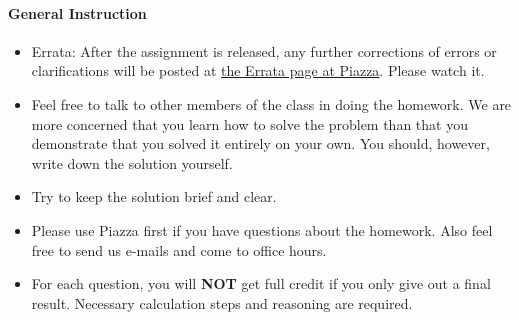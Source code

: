 

\usepackage{amsmath}
\setlength{\parindent}{0pt}
\usepackage{graphicx}
\usepackage{float}
\usepackage{bigstrut}

\usepackage{listings}
\usepackage{color}
\usepackage[utf8]{inputenc}




\oddsidemargin 0in
\evensidemargin 0in
\textwidth 6.5in
\topmargin -0.5in
\textheight 9.0in
\usepackage{multirow}
\usepackage{hyperref}

\hypersetup{colorlinks=true}
\usepackage{color}

\newcommand{\ans}[1]{}





\pagestyle{myheadings}  %

\paragraph*{General Instruction}
\begin{itemize}
\setlength{\itemsep}{2pt}
\item Errata: After the assignment is released, any further corrections of errors or clarifications will be posted at \href{https://piazza.com/class/idqujg4tiae3q0?cid=26}{the Errata page at Piazza}. Please watch it.
\item Feel free to talk to other members of the class in doing the homework. We are more concerned that
you learn how to solve the problem than that you demonstrate that you solved it entirely on your
own. You should, however, write down the solution yourself. 
\item Try to keep the solution brief
and clear. 
\item Please use Piazza first if you have questions about the homework. Also feel free to send us e-mails and come to office hours. 
\item For each question, you will \textbf{NOT} get full credit if you only give out a final result. Necessary calculation steps and reasoning are required. 

\end{itemize}

